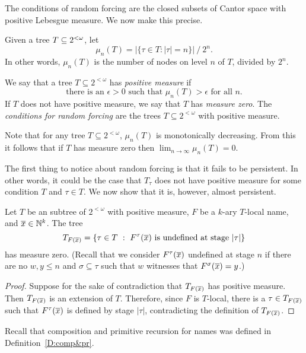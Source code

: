 The conditions of random forcing are the closed subsets of
Cantor space with positive Lebesgue measure.
We now make this precise.

Given a tree $T\subseteq2^{<\omega}$, let
$$\mu_n(T) = |\{\tau\in T:|\tau|=n\}|\ /\ 2^n.$$
In other words, $\mu_n(T)$ is the number of nodes on level $n$
of $T$, divided by $2^n$.

We say that a tree $T\subseteq 2^{<\omega}$ has \textit{positive measure} if
$$\text{there is an }\epsilon>0\text{ such that } \mu_n(T)>\epsilon \text{ for all }n.$$
If $T$ does not have positive measure, we say that $T$ has \textit{measure zero}.
The \textit{conditions for random forcing} are the trees $T\subseteq 2^{<\omega}$ with positive measure.

Note that for any tree $T\subseteq 2^{<\omega}$,
$\mu_n(T)$ is monotonically decreasing.
From this it follows that if $T$ has measure zero then
$\displaystyle \lim_{n\to\infty} \mu_n(T)=0$.

The first thing to notice about random forcing is that
it fails to be persistent.
In other words, it could be the case that $T_\tau$ does not have positive measure
for some condition $T$ and $\tau\in T$.
We now show that it is, however, almost persistent.

\begin{lem}[\RCAo]\label{L:R:locallem}
Let $T$ be an subtree of $2^{<\omega}$ with positive measure,
$F$ be a $k$-ary $T$-local name, and $\overline{x}\in\mathbb{N}^k$.
The tree
$$T_{F(\overline{x})}=\left\{\tau\in T\ :\ F^\tau(\overline{x})\text{ is undefined at stage }|\tau|\right\}$$
has measure zero.
(Recall that we consider $F^\tau(\overline{x})$ undefined at stage $n$ if
there are no $w,y\leq n$ and $\sigma\subseteq\tau$
such that $w$ witnesses that $F^\sigma(\overline{x})=y$.)
\end{lem}
\begin{proof}
Suppose for the sake of contradiction that $T_{F(\overline{x})}$ has positive measure.
Then $T_{F(\overline{x})}$ is an extension of $T$.
Therefore, since $F$ is $T$-local, there is a $\tau\in T_{F(\overline{x})}$
such that $F^\tau(\overline{x})$ is defined by stage $|\tau|$,
contradicting the definition of $T_{F(\overline{x})}$.
\end{proof}

Recall that composition and primitive recursion for names
was defined in Definition~\ref{D:comp&pr}.

